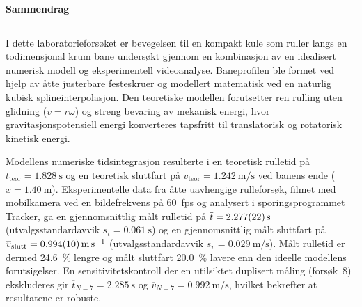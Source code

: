 \documentclass[11pt,a4paper]{article}
\begin{document}
\thispagestyle{empty}
\clearpage

\thispagestyle{fancy}
\vspace*{1.2cm}

\begin{center}
    {\Large \bfseries \textsf{Sammendrag}}\par
    \vspace{0.4cm}
    {\color{ntnublue}\rule{0.25\textwidth}{0.8pt}}\par
\end{center}

\vspace{1.0cm}

\noindent
I dette laboratorieforsøket er bevegelsen til en kompakt kule som ruller langs en todimensjonal krum bane undersøkt gjennom en kombinasjon av en idealisert numerisk modell og eksperimentell videoanalyse. Baneprofilen ble formet ved hjelp av åtte justerbare festeskruer og modellert matematisk ved en naturlig kubisk splineinterpolasjon. Den teoretiske modellen forutsetter ren rulling uten glidning ($v = r\omega$) og streng bevaring av mekanisk energi, hvor gravitasjonspotensiell energi konverteres tapsfritt til translatorisk og rotatorisk kinetisk energi.

Modellens numeriske tidsintegrasjon resulterte i en teoretisk rulletid på $t_{\text{teor}} = \SI{1,828}{\second}$ og en teoretisk sluttfart på $v_{\text{teor}} = \SI{1,242}{\meter\per\second}$ ved banens ende ($x = \SI{1,40}{\meter}$). Eksperimentelle data fra åtte uavhengige rulleforsøk, filmet med mobilkamera ved en bildefrekvens på \SI{60}{fps} og analysert i sporingsprogrammet Tracker, ga en gjennomsnittlig målt rulletid på $\overline{t} = \SI{2,277 \pm 0,022}{\second}$ (utvalgsstandardavvik $s_t = \SI{0,061}{\second}$) og en gjennomsnittlig målt sluttfart på $\overline{v}_{\text{slutt}} = \SI{0,994 \pm 0,010}{\meter\per\second}$ (utvalgsstandardavvik $s_v = \SI{0,029}{\meter\per\second}$). Målt rulletid er dermed \SI{24,6}{\percent} lengre og målt sluttfart \SI{20,0}{\percent} lavere enn den ideelle modellens forutsigelser. En sensitivitetskontroll der en utilsiktet duplisert måling (forsøk~8) ekskluderes gir $\overline{t}_{N=7} = \SI{2,285}{\second}$ og $\overline{v}_{N=7} = \SI{0,992}{\meter\per\second}$, hvilket bekrefter at resultatene er robuste.
\end{document}
